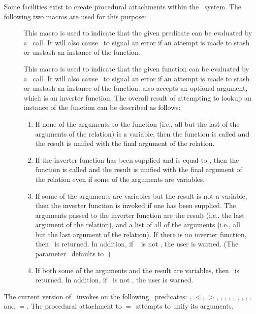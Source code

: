 Some facilities exist to create procedural attachments within the
\mvl\ system.  The following two macros are used for this purpose:
 \begin{description}
 \item [] This macro is used to indicate
that the given predicate can be evaluated by a \lisp\ call.  It will
also cause \mvl\ to signal an error if an attempt is made to stash
or unstash an instance of the function.
 \item [] This macro is used to indicate that
the given function can be evaluated by a \lisp\ call.  It will also
cause \mvl\ to signal an error if an attempt is made to stash or
unstash an instance of the function.   also
accepts an optional argument, which is an inverter function.  The
overall result of attempting to lookup an instance of the function
can be described as follows:
 \begin{enumerate}
 \item If none of the arguments to the function (i.e., all but the
last of the arguments of the relation) is a variable, then the function
is called and the result is unified with the final argument of the
relation.
 \item If the inverter function has been supplied and is equal to \T,
then the function is called and the result is unified with the final
argument of the relation even if some of the arguments are variables.
 \item If some of the arguments are variables but the result is not a
variable, then the inverter function is invoked if one has been
supplied.  The arguments passed to the inverter function are the
result (i.e., the last argument of the relation), and a list of all
of the arguments (i.e., all but the last argument of the relation).
If there is no inverter function, then \NIL\ is returned.  In
addition, if \wbli\  is not
\NIL, the user is warned.  (The parameter \wbli\ defaults to \NIL.)
 \item If both some of the arguments and the result are variables, then
\NIL\ is returned.  In addition, if \wbli\ is not \NIL, the user is
warned.
 \end{enumerate}
 \end{description}

The current version of \mvl\ invokes  on the
following \lisp\ predicates: , $<$, $>$, ,
, , , , ,
, , and $=$.  The procedural attachment
to $=$ attempts to unify its arguments.


